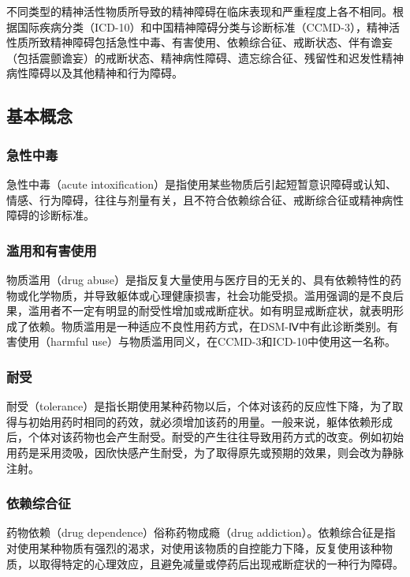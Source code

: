 不同类型的精神活性物质所导致的精神障碍在临床表现和严重程度上各不相同。根据国际疾病分类（ICD-10）和中国精神障碍分类与诊断标准（CCMD-3），精神活性质所致精神障碍包括急性中毒、有害使用、依赖综合征、戒断状态、伴有谵妄（包括震颤谵妄）的戒断状态、精神病性障碍、遗忘综合征、残留性和迟发性精神病性障碍以及其他精神和行为障碍。

\subsection{基本概念}

\subsubsection{急性中毒}

急性中毒（acute
intoxification）是指使用某些物质后引起短暂意识障碍或认知、情感、行为障碍，往往与剂量有关，且不符合依赖综合征、戒断综合征或精神病性障碍的诊断标准。

\subsubsection{滥用和有害使用}

物质滥用（drug
abuse）是指反复大量使用与医疗目的无关的、具有依赖特性的药物或化学物质，并导致躯体或心理健康损害，社会功能受损。滥用强调的是不良后果，滥用者不一定有明显的耐受性增加或戒断症状。如有明显戒断症状，就表明形成了依赖。物质滥用是一种适应不良性用药方式，在DSM-Ⅳ中有此诊断类别。有害使用（harmful
use）与物质滥用同义，在CCMD-3和ICD-10中使用这一名称。

\subsubsection{耐受}

耐受（tolerance）是指长期使用某种药物以后，个体对该药的反应性下降，为了取得与初始用药时相同的药效，就必须增加该药的用量。一般来说，躯体依赖形成后，个体对该药物也会产生耐受。耐受的产生往往导致用药方式的改变。例如初始用药是采用烫吸，因欣快感产生耐受，为了取得原先或预期的效果，则会改为静脉注射。

\subsubsection{依赖综合征}

药物依赖（drug dependence）俗称药物成瘾（drug
addiction）。依赖综合征是指对使用某种物质有强烈的渴求，对使用该物质的自控能力下降，反复使用该种物质，以取得特定的心理效应，且避免减量或停药后出现戒断症状的一种行为障碍。

